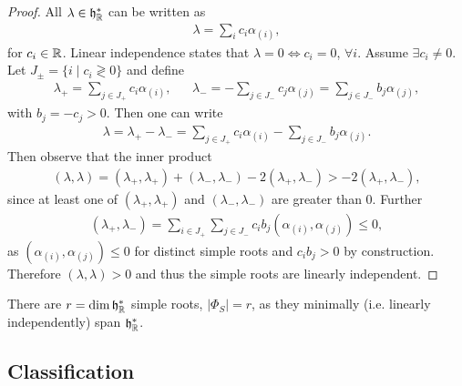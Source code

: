 
\begin{proof}
    All $\lambda \in \mathfrak{h}^{*}_{\mathbb{R}}$ can be written as 
    \begin{align}
        \lambda = \sum_{i}^{} c_i \alpha_{\left( i \right) }
    ,\end{align}
    for $c_{i} \in \mathbb{R}$. Linear independence states that $\lambda = 0 \iff c_{i} = 0$, $\forall i$. Assume $\exists c_{i} \neq 0$. Let $J_{\pm} = \{i  \mid c_{i} \gtrless 0\} $ and define
    \begin{align}
        \lambda_{+} = \sum_{j \in J_+}^{}  c_{i} \alpha_{\left( i \right) }, && \lambda_- = -\sum_{j \in J_-}^{} c_j \alpha_{\left( j \right) } =  \sum_{j \in J_-}^{} b_j \alpha_{\left( j \right) }
    ,\end{align}
    with $b_j = - c_j > 0$. Then one can write
    \begin{align}
        \lambda = \lambda_+ - \lambda_- = \sum_{j \in J_+}^{}  c_i \alpha_{\left( i \right) } - \sum_{j \in J_-}^{}  b_{j} \alpha_{\left( j \right) }
    .\end{align}
    Then observe that the inner product
    \begin{align}
        \left( \lambda, \lambda \right) = \left( \lambda_+, \lambda_+ \right) + \left( \lambda_-, \lambda_- \right) - 2\left( \lambda_+, \lambda_- \right) > -2 \left( \lambda_+, \lambda_- \right) 
    ,\end{align}
    since at least one of $\left( \lambda_+, \lambda_+ \right)$ and $\left( \lambda_- , \lambda_- \right) $ are greater than 0. Further 
    \begin{align}
        \left( \lambda_+, \lambda_- \right) = \sum_{i \in J_+}^{}  \sum_{j \in J_-}^{}  c_i b_j \left( \alpha_{\left( i \right) }, \alpha_{\left( j \right) } \right) \leq 0
    ,\end{align}
    as $\left( \alpha_{\left( i \right) }, \alpha_{\left( j \right) } \right) \leq 0$ for distinct simple roots and $c_i b_j > 0$ by construction. Therefore $\left( \lambda, \lambda \right) > 0$ and thus the simple roots are linearly independent.
\end{proof}

There are $r = \dim \mathfrak{h}^{*}_{\mathbb{R}}$ simple roots, $\left| \Phi_S \right| = r$, as they minimally (i.e. linearly independently) span $\mathfrak{h}^{*}_{\mathbb{R}}$.

\subsection{Classification}

